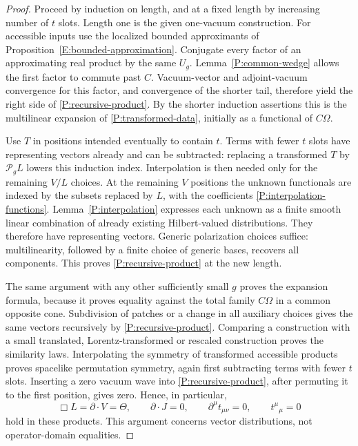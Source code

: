 \begin{proof}
Proceed by induction on length, and at a fixed length by increasing
number of $t$ slots.  Length one is the given one-vacuum construction.
For accessible inputs use the localized bounded approximants of
Proposition~\ref{E:bounded-approximation}.  Conjugate every factor of an
approximating real product by the same $U_g$.  Lemma~\ref{P:common-wedge}
allows the first factor to commute past $C$.  Vacuum-vector and
adjoint-vacuum convergence for this factor, and convergence of the
shorter tail, therefore yield the right side of
\eqref{P:recursive-product}.  By the shorter induction assertions this
is the multilinear expansion of \eqref{P:transformed-data}, initially
as a functional of $C\Omega$.

Use $T$ in positions intended eventually to contain $t$.  Terms with
fewer $t$ slots have representing vectors already and can be subtracted:
replacing a transformed $T$ by $\mathcal P_gL$ lowers this induction
index.  Interpolation is then needed only for the remaining $V/L$
choices.
At the remaining $V$ positions the unknown functionals are indexed by
the subsets replaced by $L$, with the coefficients
\eqref{P:interpolation-functions}.  Lemma~\ref{P:interpolation} expresses
each unknown as a finite smooth linear combination of already existing
Hilbert-valued distributions.  They therefore have representing
vectors.  Generic polarization choices suffice: multilinearity,
followed by a finite choice of generic bases, recovers all components.
This proves \eqref{P:recursive-product} at the new length.

The same argument with any other sufficiently small $g$ proves the
expansion formula, because it proves equality against the total family
$C\Omega$ in a common opposite cone.  Subdivision of patches or a
change in all auxiliary choices gives the same vectors recursively by
\eqref{P:recursive-product}.  Comparing a construction with a small
translated, Lorentz-transformed or rescaled construction proves the
similarity laws.  Interpolating the symmetry of transformed accessible
products proves spacelike permutation symmetry, again first subtracting
terms with fewer $t$ slots.  Inserting a zero vacuum wave into
\eqref{P:recursive-product}, after permuting it to the first position,
gives zero.  Hence, in particular,
\begin{equation}
 \Box L=\partial\cdot V=\Theta,\qquad
 \partial\cdot J=0,\qquad
 \partial^\mu t_{\mu\nu}=0,\qquad t^\mu{}_{\mu}=0
 \label{P:leg-identities}
\end{equation}
hold in these products.  This argument concerns vector distributions,
not operator-domain equalities.


\end{proof}
